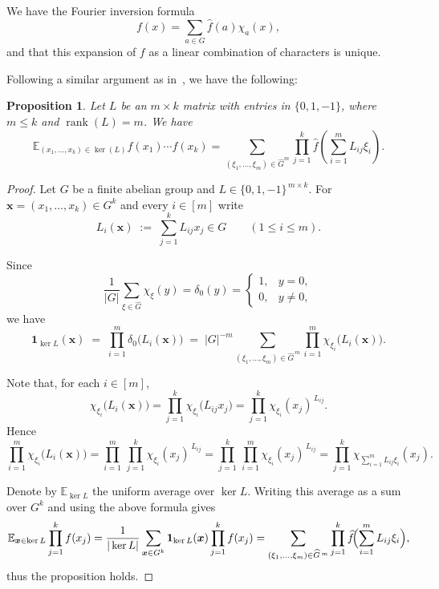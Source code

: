 \documentclass[12pt,a4paper]{article}
\theoremstyle{definition}
\theoremstyle{plain}
\newtheorem{prop}[theorem]{Proposition}
\theoremstyle{definition}
\begin{document}
We have the Fourier inversion formula
\[
f(x) = \sum_{a \in G} \widehat{f}(a) \chi_a(x),
\]
and that this expansion of $f$ as a linear combination of characters is unique. 

Following a similar argument as in~\cite{cho2024norming}, we have the following:

\begin{prop}\label{matrix}
Let $L$ be an $m \times k$ matrix with entries in $\{0, 1, -1\}$, where $m \leq k$ and $\operatorname{rank}(L) = m$. We have
\[
\mathbb{E}_{(x_1, \dots, x_k) \in \ker(L)} f(x_1) \cdots f(x_k) = \sum_{(\xi_1, \dots, \xi_m) \in \widehat{G}^m} \prod_{j=1}^k \widehat{f} \left( \sum_{i=1}^m L_{ij} \xi_i \right).
\]
\end{prop}

\begin{proof}
Let $G$ be a finite abelian group and $L\in\{0,1,-1\}^{\,m\times k}$.
For $\boldsymbol{x}=(x_1,\dots,x_k)\in G^{k}$ and every $i\in [m]$ write
\[
   L_i(\boldsymbol{x}) \;:=\; \sum_{j=1}^{k} L_{ij}x_j \in G
   \qquad(1\le i\le m).
\]

Since 
\[
\frac{1}{|G|}\sum_{\xi\in\widehat{G}}\chi_{\xi}(y)
=\delta_{0}(y)
=\begin{cases}
1, & y = 0,\\[2pt]
0, & y \neq 0,
\end{cases}
\]
we have
\[
   \mathbf 1_{\ker L}(\boldsymbol{x})
   \;=\;
   \prod_{i=1}^{m}\delta_{0}\!\bigl(L_i(\boldsymbol{x})\bigr)
   \;=\;
   |G|^{-m}
   \sum_{(\xi_1,\dots,\xi_m)\in\widehat{G}^{\,m}}
   \prod_{i=1}^{m}\chi_{\xi_i}\bigl(L_i(\boldsymbol{x})\bigr).
\]

Note that, for each $i\in[m]$,
\[
   \chi_{\xi_i}\!\bigl(L_i(\boldsymbol{x})\bigr)
   = \prod_{j=1}^{k}\chi_{\xi_i}\!\bigl(L_{ij}x_j\bigr)
   = \prod_{j=1}^{k}\chi_{\xi_i}(x_j)^{\,L_{ij}}.
\]
Hence
\[
   \prod_{i=1}^{m}\chi_{\xi_i}\!\bigl(L_i(\boldsymbol{x})\bigr)
   = \prod_{i=1}^{m}\,\prod_{j=1}^{k}\chi_{\xi_i}(x_j)^{\,L_{ij}}
   = \prod_{j=1}^{k}\,\prod_{i=1}^{m}\chi_{\xi_i}(x_j)^{\,L_{ij}}
   = \prod_{j=1}^{k}\chi_{\sum_{i=1}^{m}L_{ij}\xi_i}(x_j).
\]

Denote by $\mathbb{E}_{\ker L}$ the uniform average over $\ker L$.
Writing this average as a sum over $G^{k}$ and using the above formula gives
\[
   \mathbb{E}_{\boldsymbol{x}\in\ker L}\prod_{j=1}^{k}f(x_j)
   =\frac{1}{|\ker L|}\sum_{\boldsymbol{x}\in G^{k}}
      \mathbf 1_{\ker L}(\boldsymbol{x})\prod_{j=1}^{k}f(x_j)
   =\sum_{(\xi_1,\dots,\xi_m)\in\widehat{G}^{\,m}}
     \prod_{j=1}^{k}\widehat f\!\Bigl(\sum_{i=1}^{m}L_{ij}\xi_i\Bigr),
\]
thus the proposition holds.

\end{proof}
\end{document}
